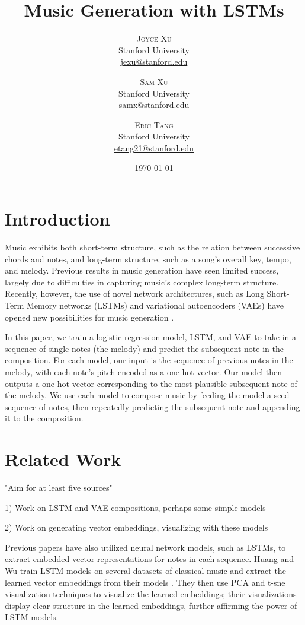 \documentclass[twoside,twocolumn]{article}
\title{Music Generation with LSTMs} %
\author{%
\textsc{Joyce Xu} \\[1ex] %
\normalsize Stanford University \\ %
\normalsize \href{mailto:jexu@stanford.edu}{jexu@stanford.edu} %
\and %
\textsc{Sam Xu} \\[1ex] %
\normalsize Stanford University \\ %
\normalsize \href{mailto:samx}{samx@stanford.edu} %
\and %
\textsc{Eric Tang} \\[1ex] %
\normalsize Stanford University \\ %
\normalsize \href{mailto:etang21@stanford.edu}{etang21@stanford.edu} %
}
\date{\today} %
\begin{document}
\maketitle


\section{Introduction}

Music exhibits both short-term structure, such as the relation between successive chords and notes, and long-term structure, such as a song's overall key, tempo, and melody. Previous results in music generation have seen limited success, largely due to difficulties in capturing music's complex long-term structure. Recently, however, the use of novel network architectures, such as Long Short-Term Memory networks (LSTMs) and variational autoencoders (VAEs) have opened new possibilities for music generation \cite{lstm-vae}.

In this paper, we train a logistic regression model, LSTM, and VAE to take in a sequence of single notes (the melody) and predict the subsequent note in the composition. For each model, our input is the sequence of previous notes in the melody, with each note's pitch encoded as a one-hot vector. Our model then outputs a one-hot vector corresponding to the most plausible subsequent note of the melody. We use each model to compose music by feeding the model a seed sequence of notes, then repeatedly predicting the subsequent note and appending it to the composition.


\section{Related Work}

"Aim for at least five sources"

1) Work on LSTM and VAE compositions, perhaps some simple models

2) Work on generating vector embeddings, visualizing with these models

Previous papers have also utilized neural network models, such as LSTMs, to extract embedded vector representations for notes in each sequence. Huang and Wu train LSTM models on several datasets of classical music and extract the learned vector embeddings from their models \cite{lstm-embeddings}. They then use PCA and t-sne visualization techniques to visualize the learned embeddings; their visualizations display clear structure in the learned embeddings, further affirming the power of LSTM models.
\end{document}
